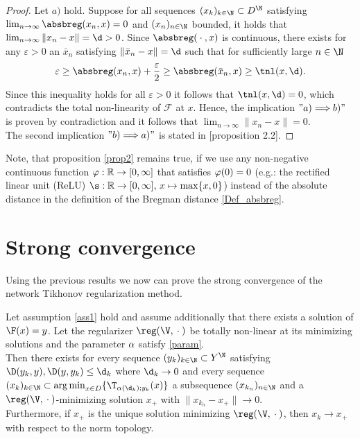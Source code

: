 \begin{proof}
Let $a)$ hold. Suppose for all sequences $(x_k)_{k \in\N} \subset D^{\N}$ satisfying $\lim_{n \to \infty}\absbreg(x_n,x) = 0$ and $(x_n)_{n\in\N}$ bounded, it holds that $\lim_{n\to\infty} \|x_n - x\| = \d > 0$. Since $\absbreg(\wc,x)$ is continuous, there exists for any $\varepsilon > 0$ an $\bar{x}_n$ satisfying $\|\bar{x}_n - x\| = \d$ such that for sufficiently large $n \in\N$
\begin{align*}
\varepsilon \geq \absbreg(x_n,x) + \frac{\varepsilon}{2} \geq \absbreg(\bar{x}_n,x) \geq \tnl(x,\d).
\end{align*}
Since this inequality holds for all $\varepsilon > 0$ it follows that $\tnl(x,\d)=0$, which contradicts the total non-linearity of $\mathcal{F}$ at $x$. Hence, the implication $"a) \Longrightarrow b)"$ is proven by contradiction and it follows that $\lim_{n\to\infty} \|x_n - x\| = 0$.\\
The second implication $"b) \Longrightarrow a)"$ is stated in \cite{resmerita2004total}[proposition 2.2].
\end{proof}

\begin{remark}
Note, that proposition \ref{prop2} remains true, if we use any non-negative continuous function $\operatorname{\varphi}: \operatorname{\mathbb{R}} \to [0, \infty]$ that satisfies $\operatorname{\varphi}(0) = 0$ (e.g.: the rectified linear unit (ReLU) $\s: \R \to [0,\infty],\, x \mapsto \max\{x, 0\}$) instead of the absolute distance in the definition of the Bregman distance \ref{Def_absbreg}.
\end{remark}

\section{Strong convergence}

Using the previous results we now can prove the strong convergence of the network Tikhonov regularization method.

\begin{theorem}\label{theorem2}
Let assumption \ref{ass1} hold and assume additionally that there exists a solution of $\F(x) = y$. Let the regularizer $\reg(\V,\wc)$ be totally non-linear at its minimizing solutions and the parameter $\alpha$ satisfy \eqref{param}.\\
Then there exists for every sequence $(y_k)_{k\in\N} \subset Y^{\N}$ satisfying $\D(y_k,y), \D(y,y_k)\leq \d_k$ where $\d_k \to 0$ and every sequence $(x_k)_{k\in\N} \subset \argmin_{x\in D}\{\T_{\a(\d_k);y_k}(x)\}$ a subsequence $(x_{k_n})_{n\in\N}$ and a $\reg(\V,\wc)$-minimizing solution $x_+$ with $\|x_{k_n} - x_+\|\to 0$.\\
Furthermore, if $x_+$ is the unique solution minimizing $\reg(\V,\wc)$, then $x_k \to x_+$ with respect to the norm topology.
\end{theorem}


